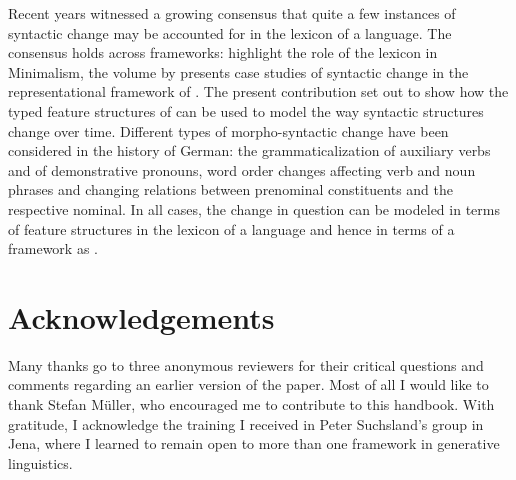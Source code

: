 \documentclass[output=paper
                ,modfonts
                ,nonflat
	        ,collection
	        ,collectionchapter
	        ,collectiontoclongg
 	        ,biblatex
                ,babelshorthands
                ,newtxmath
                ,draftmode
                ,colorlinks, citecolor=brown
]{./langsci/langscibook}
\begin{document}
Recent years witnessed a growing consensus that quite a few  instances of syntactic change may be accounted for in the lexicon of a language. The consensus holds across frameworks: \cite{BiWa2015} highlight the role of the lexicon in Minimalism, the volume by \cite{BuKi2001} presents case studies of syntactic change in the representational framework of \lfg. The present contribution set out to show how the typed feature structures of \hpsg can be used to model the way syntactic structures change over time. Different types of morpho-syntactic change have been considered in the history of German: the grammaticalization of auxiliary verbs and of demonstrative pronouns, word order changes affecting verb and noun phrases and changing relations between prenominal constituents and the respective nominal. In all cases, the change in question can be modeled in terms of feature structures in the lexicon of a language and hence in terms of a framework as \hpsg.  


\section*{Acknowledgements}
Many thanks go to three anonymous reviewers for their critical questions and comments regarding an earlier version of the paper. Most of all I would like to thank Stefan Müller, who encouraged me to contribute to this handbook. With gratitude, I acknowledge the training I received in Peter Suchsland's group in Jena, where I learned to remain open to more than one framework in generative linguistics.



\nocite{Schoene1939a,Lindo1966a,DeReKo-dia,Simplicissimus}
{\sloppy
\printbibliography[heading=diachrony-sources,keyword=diachrony-source]
}
\end{document}
